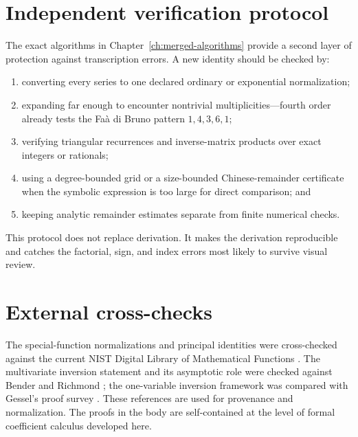 \documentclass[11pt,a4paper,oneside,openany]{book}
\theoremstyle{definition}
\theoremstyle{remark}
\begin{document}
\section{Independent verification protocol}
The exact algorithms in Chapter~\ref{ch:merged-algorithms} provide a second layer of
protection against transcription errors.  A new identity should be checked by:
\begin{enumerate}
\item converting every series to one declared ordinary or exponential
      normalization;
\item expanding far enough to encounter nontrivial multiplicities---fourth order
      already tests the Fa\`a di Bruno pattern $1,4,3,6,1$;
\item verifying triangular recurrences and inverse-matrix products over exact
      integers or rationals;
\item using a degree-bounded grid or a size-bounded Chinese-remainder certificate
      when the symbolic expression is too large for direct comparison; and
\item keeping analytic remainder estimates separate from finite numerical checks.
\end{enumerate}
This protocol does not replace derivation.  It makes the derivation reproducible and
catches the factorial, sign, and index errors most likely to survive visual review.

\section{External cross-checks}
The special-function normalizations and principal identities were cross-checked
against the current NIST Digital Library of Mathematical Functions
\cite{NISTDLMF}.  The multivariate inversion statement and its asymptotic role were
checked against Bender and Richmond \cite{BenderRichmond1998}; the one-variable
inversion framework was compared with Gessel's proof survey \cite{Gessel2016}.
These references are used for provenance and normalization.  The proofs in the body
are self-contained at the level of formal coefficient calculus developed here.
\end{document}
